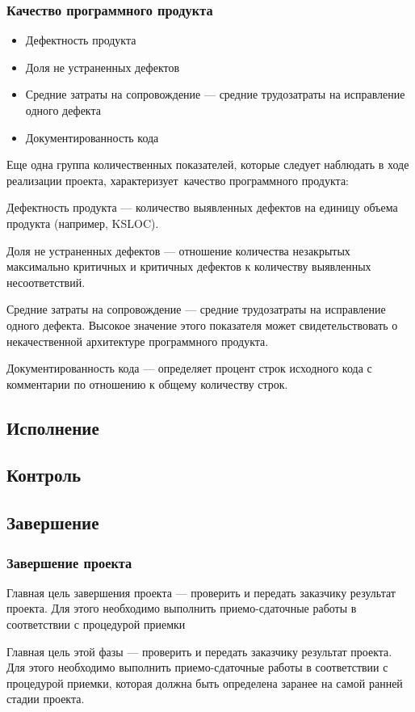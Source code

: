 \documentclass{../industrial-development}
\begin{document}
    \begin{frame} \frametitle{Качество программного продукта}
        \begin{itemize}
            \item Дефектность продукта
            \item Доля не устраненных дефектов 
            \item Средние затраты на сопровождение — средние трудозатраты на исправление одного дефекта
            \item Документированность кода
        \end{itemize}
    \end{frame}
    \lecturenotes
Еще одна группа количественных показателей, которые следует наблюдать в ходе реализации проекта, характеризует качество программного продукта:

Дефектность продукта — количество выявленных дефектов на единицу объема продукта (например, KSLOC).

Доля не устраненных дефектов — отношение количества незакрытых максимально критичных и критичных дефектов к количеству выявленных несоответствий.

Средние затраты на сопровождение — средние трудозатраты на исправление одного дефекта. 
Высокое значение этого показателя может свидетельствовать о некачественной архитектуре программного продукта.

Документированность кода — определяет процент строк исходного кода с комментарии по отношению к общему количеству строк.

    \subsection{Исполнение}

    \subsection{Контроль}

    \subsection{Завершение}

    \begin{frame} \frametitle{Завершение проекта}
        Главная цель завершения проекта — проверить и передать заказчику результат проекта. Для этого необходимо выполнить приемо-сдаточные работы в соответствии с процедурой приемки
    \end{frame}
    \lecturenotes
Главная цель этой фазы — проверить и передать заказчику результат проекта. Для этого необходимо выполнить приемо-сдаточные работы в соответствии с процедурой приемки, которая должна быть определена заранее на самой ранней стадии проекта.
\end{document}
